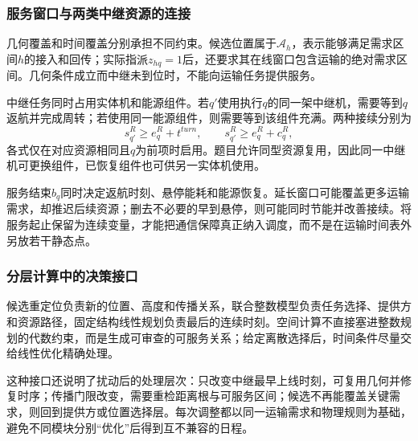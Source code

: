 \subsubsection{服务窗口与两类中继资源的连接}
几何覆盖和时间覆盖分别承担不同约束。候选位置属于$\mathcal A_h$，表示能够满足需求区间$h$的接入和回传；实际指派$z_{hq}=1$后，还要求其在线窗口包含运输的绝对需求区间。几何条件成立而中继未到位时，不能向运输任务提供服务。

中继任务同时占用实体机和能源组件。若$q'$使用执行$q$的同一架中继机，需要等到$q$返航并完成周转；若使用同一能源组件，则需要等到该组件充满。两种接续分别为
\begin{equation}
 s_{q'}^R\ge e_q^R+t^{turn},\qquad
 s_{q'}^R\ge e_q^R+c_q^R,
 \label{eq:q3_two_relay_resources}
\end{equation}
各式仅在对应资源相同且$q$为前项时启用。题目允许同型资源复用，因此同一中继机可更换组件，已恢复组件也可供另一实体机使用。

服务结束$b_q$同时决定返航时刻、悬停能耗和能源恢复。延长窗口可能覆盖更多运输需求，却推迟后续资源；删去不必要的早到悬停，则可能同时节能并改善接续。将服务起止保留为连续变量，才能把通信保障真正纳入调度，而不是在运输时间表外另放若干静态点。

\subsubsection{分层计算中的决策接口}
候选重定位负责新的位置、高度和传播关系，联合整数模型负责任务选择、提供方和资源路径，固定结构线性规划负责最后的连续时刻。空间计算不直接塞进整数规划的代数约束，而是生成可审查的可服务关系；给定离散选择后，时间条件尽量交给线性优化精确处理。

这种接口还说明了扰动后的处理层次：只改变中继最早上线时刻，可复用几何并修复时序；传播门限改变，需要重检距离根与可服务区间；候选不再能覆盖关键需求，则回到提供方或位置选择层。每次调整都以同一运输需求和物理规则为基础，避免不同模块分别“优化”后得到互不兼容的日程。
